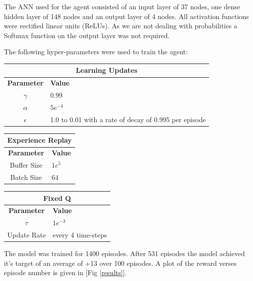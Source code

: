 \documentclass[12pt]{article}
\begin{document}
The ANN used for the agent consisted of an input layer of 37 nodes, one dense hidden layer of 148 nodes and an output layer of 4 nodes.
All activation functions were rectified linear units (ReLUs). 
As we are not dealing with probabilities a Softmax function on the output layer was not required.

The following hyper-parameters were used to train the agent:


\begin{table}[h!t]
\begin{center}
\begin{tabular}{|c|l|}
	\hline
	\multicolumn{2}{|c|}{\textbf{Learning Updates}}\\
	\hline
	\hline
	\textbf{Parameter} & \textbf{Value}\\
	\hline
	$\gamma$ & $0.99$\\
	$\alpha$ & $5e^{-4}$\\
	$\epsilon$ & 1.0 to 0.01 with a rate of decay of 0.995 per episode\\
	\hline
\end{tabular}
\end{center}
\end{table}

\begin{table}[h!t]
\begin{minipage}{.5\linewidth}
\begin{tabular}{|c|l|}
	\hline
	\multicolumn{2}{|c|}{\textbf{Experience Replay}}\\
	\hline
	\hline
	\textbf{Parameter} & \textbf{Value}\\
	\hline
	Buffer Size & $1e^{5}$\\
	Batch Size & $64$\\
	\hline
\end{tabular}
\end{minipage}
\begin{minipage}{.5\linewidth}
\begin{tabular}{|c|l|}
	\hline
	\multicolumn{2}{|c|}{\textbf{Fixed Q}}\\
	\hline
	\hline
	\textbf{Parameter} & \textbf{Value}\\
	\hline
		$\tau$ & $1e^{-3}$\\
		Update Rate & every 4 time-steps \\
	\hline
\end{tabular}
\end{minipage}
\end{table}

The model was trained for 1400 episodes. 
After 531 episodes the model achieved it's target of an average of +13 over 100 episodes.
A plot of the reward verses episode number is given in [Fig \ref{results}].
\end{document}
